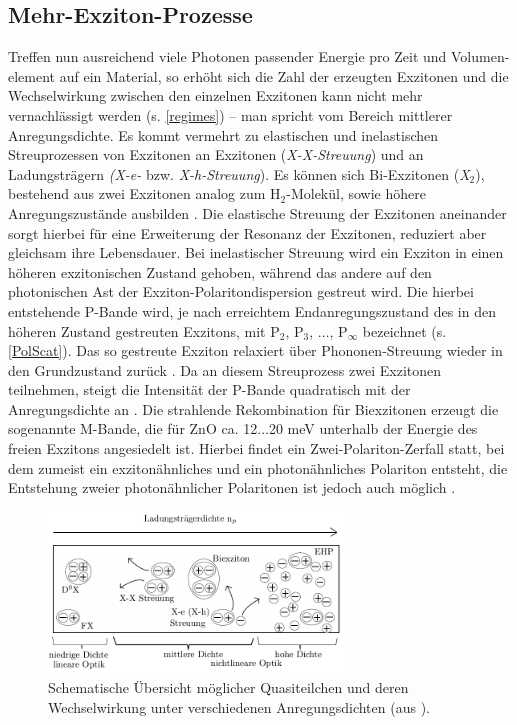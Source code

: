 \subsection{Mehr-Exziton-Prozesse}
Treffen nun ausreichend viele Photonen passender Energie pro Zeit und Volumen- element auf ein Material, so erhöht sich die Zahl der erzeugten Exzitonen und die Wechselwirkung zwischen den einzelnen Exzitonen kann nicht mehr vernachlässigt \mbox{werden} (s. \autoref{regimes}) – man spricht vom Bereich mittlerer Anregungsdichte. Es kommt \mbox{vermehrt} zu elastischen und inelastischen Streuprozessen von Exzitonen an \mbox{Exzitonen} (\textit{X-X-Streuung}) und an Ladungsträgern \textit{(X-e-} bzw. \textit{X-h-Streuung}). Es können sich Bi-Exzitonen (\textit{X$_\text{2}$}), bestehend aus zwei Exzitonen analog zum H$_\text{2}$-Molekül, sowie höhere Anregungszustände ausbilden \cite{Corfdir.2011}. Die elastische Streuung der Exzitonen aneinander sorgt hierbei für eine Erweiterung der Resonanz der Exzitonen, reduziert aber \mbox{gleichsam} ihre Lebensdauer. Bei inelastischer Streuung wird ein Exziton in einen \mbox{höheren} exzitonischen Zustand gehoben, während das andere auf den photonischen Ast der Exziton-Polaritondispersion gestreut wird. Die hierbei entstehende P-Bande wird, je nach erreichtem Endanregungszustand des in den höheren Zustand gestreuten Exzitons, mit P$_\text{2}$, P$_\text{3}$, $\ldots$, P$_\infty$ bezeichnet (s. \autoref{PolScat}). Das so gestreute Exziton relaxiert über Phononen-Streuung wieder in den Grundzustand zurück \cite{Klingshirn.1975}.
Da an diesem Streuprozess zwei Exzitonen teilnehmen, steigt die Intensität der P-Bande quadratisch mit der Anregungsdichte an \cite{Priller.2004}. Die strahlende Rekombination für Biexzitonen erzeugt die sogenannte M-Bande, die für ZnO ca. 12$\ldots$20 meV unterhalb der Energie des freien Exzitons angesiedelt ist. Hierbei findet ein Zwei-Polariton-Zerfall statt, bei dem zumeist ein exzitonähnliches und ein photonähnliches Polariton entsteht, die Entstehung zweier photonähnlicher Polaritonen ist jedoch auch möglich \cite{Hvam.1983}. 
\begin{figure}[htb]
\centering
\includegraphics[width=0.7\textwidth]{Bilder/Vorbetrachtung/regimes}
\caption[Übersicht Exzitonen unter hohen Anregungsdichten]{Schematische Übersicht möglicher Quasiteilchen und deren Wechselwirkung unter verschiedenen Anregungsdichten (aus \cite{Richters.Diss}).}
\label{regimes}
\end{figure}
